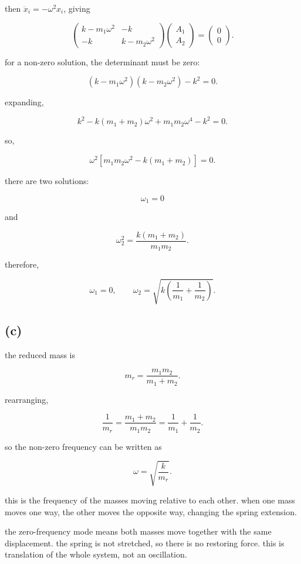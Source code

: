 \documentclass{article}
\begin{document}
then $\ddot{x}_i=-\omega^2x_i$, giving

\[
\begin{pmatrix}
k-m_1\omega^2&-k\\
-k&k-m_2\omega^2
\end{pmatrix}
\begin{pmatrix}
A_1\\
A_2
\end{pmatrix}
=
\begin{pmatrix}
0\\
0
\end{pmatrix}.
\]

for a non-zero solution, the determinant must be zero:

\[
(k-m_1\omega^2)(k-m_2\omega^2)-k^2=0.
\]

expanding,

\[
k^2-k(m_1+m_2)\omega^2+m_1m_2\omega^4-k^2=0.
\]

so,

\[
\omega^2\left[m_1m_2\omega^2-k(m_1+m_2)\right]=0.
\]

there are two solutions:

\[
\omega_1=0
\]

and

\[
\omega_2^2=\frac{k(m_1+m_2)}{m_1m_2}.
\]

therefore,

\[
\boxed{\omega_1=0,\qquad
\omega_2=\sqrt{k\left(\frac{1}{m_1}+\frac{1}{m_2}\right)}}.
\]

\subsection*{(c)}

the reduced mass is

\[
m_r=\frac{m_1m_2}{m_1+m_2}.
\]

rearranging,

\[
\frac{1}{m_r}=\frac{m_1+m_2}{m_1m_2}
=\frac{1}{m_1}+\frac{1}{m_2}.
\]

so the non-zero frequency can be written as

\[
\boxed{\omega=\sqrt{\frac{k}{m_r}}}.
\]

this is the frequency of the masses moving relative to each other. when one mass moves one way, the other moves the opposite way, changing the spring extension.

the zero-frequency mode means both masses move together with the same displacement. the spring is not stretched, so there is no restoring force. this is translation of the whole system, not an oscillation.
\end{document}

